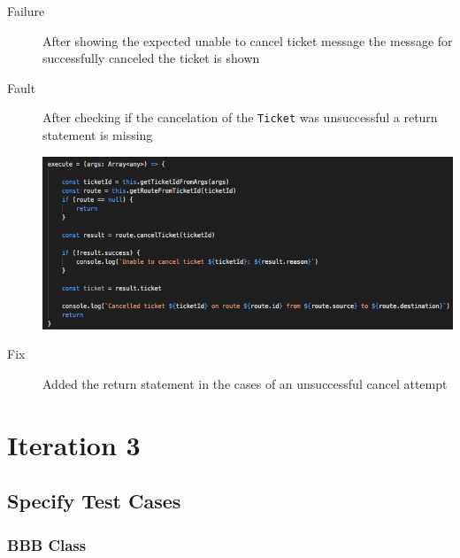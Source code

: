 \documentclass[11pt]{article}
\begin{document}
\begin{description}
\item[{Failure}] After showing the expected unable to cancel ticket message the message for successfully canceled the ticket is shown
\item[{Fault}] After checking if the cancelation of the \texttt{Ticket} was unsuccessful a return statement is missing
\begin{center}
\includegraphics[width=.9\linewidth]{./Iteration3.rtfd/Pasted Graphic 13.tiff.png}
\end{center}
\item[{Fix}] Added the return statement in the cases of an unsuccessful cancel attempt
\end{description}

\section{Iteration 3}
\label{sec:orgec744f5}

\subsection{Specify Test Cases}
\label{sec:org9d324a5}

\subsubsection{BBB Class}
\label{sec:orgaf8a8c7}
\end{document}
